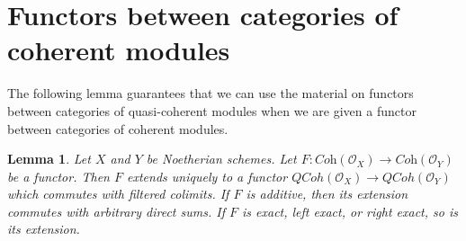 \documentclass{stacks-project}
\theoremstyle{plain}
\newtheorem{lemma}[subsection]{Lemma}
\theoremstyle{definition}
\theoremstyle{remark}
\numberwithin{equation}{subsection}
\def\QCoh{\mathit{QCoh}}
\begin{document}
\section{Functors between categories of coherent modules}
\label{section-functor-coherent}

\noindent
The following lemma guarantees that we can use the material on
functors between categories of quasi-coherent modules when
we are given a functor between categories of coherent modules.

\begin{lemma}
\label{lemma-functor-coherent}
Let $X$ and $Y$ be Noetherian schemes. Let
$F : \textit{Coh}(\mathcal{O}_X) \to \textit{Coh}(\mathcal{O}_Y)$
be a functor. Then $F$ extends uniquely to a functor
$\QCoh(\mathcal{O}_X) \to \QCoh(\mathcal{O}_Y)$
which commutes with filtered colimits.
If $F$ is additive, then its extension commutes with arbitrary direct sums.
If $F$ is exact, left exact, or right exact, so is its extension.
\end{lemma}
\end{document}
